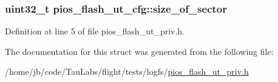 \hypertarget{structpios__flash__ut__cfg_aa71a1f1da59549e862bcdbeae72174b8}{
\subsubsection[{size\-\_\-of\-\_\-sector}]{\setlength{\rightskip}{0pt plus 5cm}uint32\-\_\-t {\bf pios\-\_\-flash\-\_\-ut\-\_\-cfg\-::size\-\_\-of\-\_\-sector}}}\label{structpios__flash__ut__cfg_aa71a1f1da59549e862bcdbeae72174b8}


\-Definition at line 5 of file pios\-\_\-flash\-\_\-ut\-\_\-priv.\-h.



\-The documentation for this struct was generated from the following file\-:\begin{DoxyCompactItemize}
\item 
/home/jb/code/\-Tau\-Labs/flight/tests/logfs/\hyperlink{pios__flash__ut__priv_8h}{pios\-\_\-flash\-\_\-ut\-\_\-priv.\-h}\end{DoxyCompactItemize}
